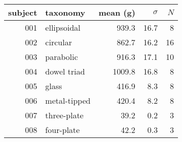 \documentclass[border=0pt]{standalone}
\begin{document}
\begin{tabular}{rlrrr}%
subject & taxonomy & mean (g) & $\sigma$ & $N$ \\
\hline
001 & ellipsoidal & 939.3 & 16.7 & 8 \\
002 & circular & 862.7 & 16.2 & 16 \\
003 & parabolic & 916.3 & 17.1 & 10 \\
004 & dowel triad & 1009.8 & 16.8 & 8 \\
005 & glass & 416.9 & 8.3 & 8 \\
006 & metal-tipped & 420.4 & 8.2 & 8 \\
007 & three-plate & 39.2 & 0.2 & 3 \\
008 & four-plate & 42.2 & 0.3 & 3 \\
\hline
\end{tabular}
\end{document}
